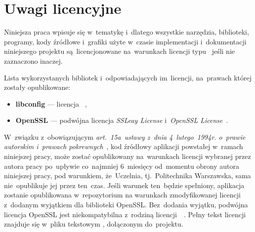 \documentclass[thesis]{subfiles}
\begin{document}

\section{Uwagi licencyjne}

Niniejsza praca wpisuje się w~tematykę  i~dlatego wszystkie narzędzia, biblioteki, programy, kody źródłowe i~grafiki użyte w~czasie implementacji i~dokumentacji niniejszego projektu są~licencjonowane na~warunkach licencji typu~ jeśli nie zaznaczono inaczej.

Lista wykorzystanych bibliotek i~odpowiadających im~licencji, na~prawach której zostały opublikowane:
\begin{itemize}
\item \textbf{libconfig} --- licencja ~\cite{libconfig-webpage},
\item \textbf{OpenSSL} --- podwójna licencja \emph{SSLeay License} i~\emph{OpenSSL License}~\cite{openssl-license}.
\end{itemize}

W~związku z~obowiązującym \emph{art.~15a~ustawy z~dnia 4~lutego~1994r. o~prawie autorskim i~prawach pokrewnych}~\cite{papp}, kod źródłowy aplikacji powstałej w~ramach niniejszej pracy, może zostać opublikowany na~warunkach licencji wybranej przez autora pracy po~upływie co~najmniej 6~miesięcy od~momentu obrony autora niniejszej pracy, pod warunkiem, że~Uczelnia, tj.~Politechnika Warszawska, sama nie~opublikuje jej przez ten~czas. Jeśli warunek ten~będzie spełniony, aplikacja zostanie opublikowana w~repozytorium  na warunkach zmodyfikowanej licencji  z~dodanym wyjątkiem dla biblioteki OpenSSL. Bez~dodania wyjątku, podwójna licencja OpenSSL jest niekompatybilna z~rodziną licencji~~\cite{openssl-license-incompatibility,openssl-license-incompatibility-2}. Pełny tekst licencji znajduje się w~pliku tekstowym , dołączonym do~projektu.

\newpage
\end{document}
